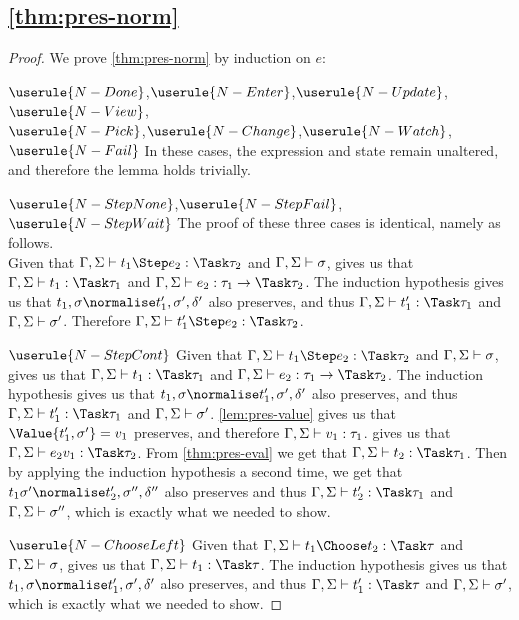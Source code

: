 \subsection{\cref{thm:pres-norm}}

\begin{proof}
We prove \cref{thm:pres-norm} by induction on $e$:

\case
  {$\userule{N-Done}$,$\userule{N-Enter}$,$\userule{N-Update}$,$\userule{N-View}$,\\$\userule{N-Pick}$,$\userule{N-Change}$,$\userule{N-Watch}$,$\userule{N-Fail}$}
  {In these cases, the expression and state remain unaltered, and therefore the lemma holds trivially.}

\case
  {$\userule{N-StepNone}$,$\userule{N-StepFail}$,\\$\userule{N-StepWait}$}
  {The proof of these three cases is identical, namely as follows.\\
  Given that $\Gamma,\Sigma\infers t_1\Step e_2:\Task\tau_2$ and $\Gamma,\Sigma\vdash \sigma$,  gives us that $\Gamma,\Sigma\infers t_1:\Task\tau_1$ and $\Gamma,\Sigma\infers e_2:\tau_1\to\Task \tau_2$.
  The induction hypothesis gives us that $t_1,\sigma\normalise t_1',\sigma',\delta'$ also preserves, and thus $\Gamma,\Sigma\infers t_1':\Task\tau_1$ and $\Gamma,\Sigma\vdash\sigma'$.
  Therefore $\Gamma,\Sigma\infers t_1'\Step e_2:\Task\tau_2$.}

\case
  {$\userule{N-StepCont}$}
  {Given that $\Gamma,\Sigma\infers t_1\Step e_2:\Task\tau_2$ and $\Gamma,\Sigma\vdash \sigma$,  gives us that $\Gamma,\Sigma\infers t_1:\Task\tau_1$ and $\Gamma,\Sigma\infers e_2:\tau_1\to\Task \tau_2$.
  The induction hypothesis gives us that $t_1,\sigma\normalise t_1',\sigma',\delta'$ also preserves, and thus $\Gamma,\Sigma\infers t_1':\Task\tau_1$ and $\Gamma,\Sigma\vdash\sigma'$.
  \cref{lem:pres-value} gives us that $\Value{t_1',\sigma'}=v_1$ preserves, and therefore $\Gamma,\Sigma\vdash v_1:\tau_1$.
   gives us that $\Gamma,\Sigma\infers e_2 v_1 : \Task\tau_2$.
  From \cref{thm:pres-eval} we get that $\Gamma,\Sigma\infers t_2:\Task\tau_1$.
  Then by applying the induction hypothesis a second time, we get that $t_1\sigma'\normalise t_2',\sigma'',\delta''$ also preserves and thus $\Gamma,\Sigma\infers t_2':\Task\tau_1$ and $\Gamma,\Sigma\vdash \sigma''$, which is exactly what we needed to show.}

\case
  {$\userule{N-ChooseLeft}$}
  {Given that $\Gamma,\Sigma\infers t_1 \Choose t_2 : \Task \tau$ and $\Gamma,\Sigma\vdash\sigma$,  gives us that $\Gamma,\Sigma\infers t_1:\Task\tau$.
  The induction hypothesis gives us that $t_1,\sigma\normalise t_1',\sigma',\delta'$ also preserves,
  and thus $\Gamma,\Sigma\infers t_1':\Task\tau$ and $\Gamma,\Sigma\vdash \sigma'$, which is exactly what we needed to show.}


\end{proof}
